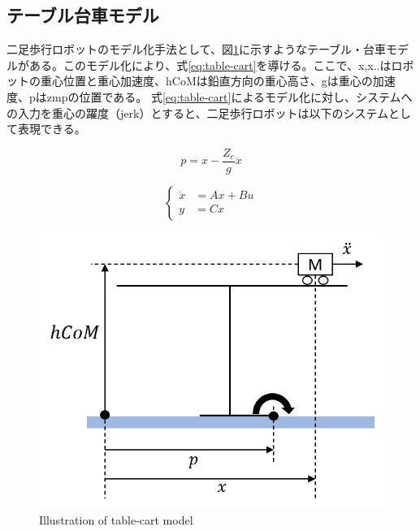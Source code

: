 \subsection{テーブル台車モデル}
二足歩行ロボットのモデル化手法として、図\ref{Fig:tablecart}に示すようなテーブル・台車モデルがある。このモデル化により、式\eqref{eq:table-cart}を導ける。ここで、x,x..はロボットの重心位置と重心加速度、hCoMは鉛直方向の重心高さ、gは重心の加速度、pはzmpの位置である。
式\eqref{eq:table-cart}によるモデル化に対し、システムへの入力を重心の躍度（jerk）とすると、二足歩行ロボットは以下のシステムとして表現できる。

\begin{equation}
  p = x - \frac{Z_{c}}{g}\ddot{x}
  \label{eq:table-cart}
\end{equation}

\begin{equation}
  \begin{cases}
    \dot{x} &= Ax + Bu\\
    y &= Cx
  \end{cases}
  \label{eq:humanoid-system}
\end{equation}



\begin{figure}[hbtp]
  \centering
  \includegraphics[keepaspectratio, scale=0.6]
  {images/table_cart_hcom.png}
  \caption{Illustration of table-cart model }
  \label{Fig:tablecart}
\end{figure}

\newpage

